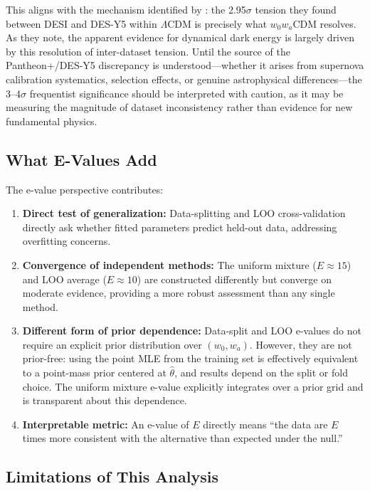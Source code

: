 \documentclass[11pt,a4paper]{article}
\newcommand{\LCDM}{$\Lambda$CDM}
\begin{document}
This aligns with the mechanism identified by \citet{OngBayesian2025}: the 2.95$\sigma$ tension they found between DESI and DES-Y5 within \LCDM{} is precisely what $w_0w_a$CDM resolves. As they note, the apparent evidence for dynamical dark energy is largely driven by this resolution of inter-dataset tension. Until the source of the Pantheon+/DES-Y5 discrepancy is understood---whether it arises from supernova calibration systematics, selection effects, or genuine astrophysical differences---the 3--4$\sigma$ frequentist significance should be interpreted with caution, as it may be measuring the magnitude of dataset inconsistency rather than evidence for new fundamental physics.

\subsection{What E-Values Add}

The e-value perspective contributes:
\begin{enumerate}
    \item \textbf{Direct test of generalization:} Data-splitting and LOO cross-validation directly ask whether fitted parameters predict held-out data, addressing overfitting concerns.

    \item \textbf{Convergence of independent methods:} The uniform mixture ($E \approx 15$) and LOO average ($E \approx 10$) are constructed differently but converge on moderate evidence, providing a more robust assessment than any single method.

    \item \textbf{Different form of prior dependence:} Data-split and LOO e-values do not require an explicit prior distribution over $(w_0, w_a)$. However, they are not prior-free: using the point MLE from the training set is effectively equivalent to a point-mass prior centered at $\hat{\theta}$, and results depend on the split or fold choice. The uniform mixture e-value explicitly integrates over a prior grid and is transparent about this dependence.

    \item \textbf{Interpretable metric:} An e-value of $E$ directly means ``the data are $E$ times more consistent with the alternative than expected under the null.''
\end{enumerate}

\subsection{Limitations of This Analysis}
\label{sec:limitations}
\end{document}
